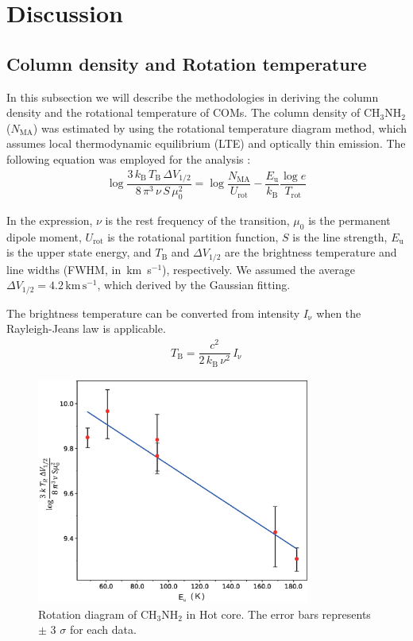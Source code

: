 \chapter{Discussion
  \label{chap:discussion}}

\section{Column density and Rotation temperature}

In this subsection we will describe the methodologies in deriving the column density and the rotational temperature of COMs.
The column density of CH$_{3}$NH$_{2}$ ($N_{\mathrm{MA}}$) was estimated by using 
the rotational temperature diagram method, which assumes local thermodynamic equilibrium 
(LTE) and optically thin emission. 
The following equation was employed for the analysis \citep{Turner1991}:
\begin{align}
\log \dfrac{3\,k_{\mathrm{B}}\,T_{\mathrm{B}} \,\Delta V_{1/2}}{8\, \pi^3\, \nu\, S\, \mu_0^2} = \log \dfrac{N_{\mathrm{MA}}}{U_{\mathrm{rot}}} - \dfrac{E_{\mathrm{u}}}{k_{\mathrm{B}}} \dfrac{\log e}{T_{\mathrm{rot}}}
\label{eq:RD}
\end{align}

In the expression, $\nu$ is the rest frequency of the transition, $\mu_0$ is the permanent dipole moment, 
$U_{\mathrm{rot}}$ is the rotational partition function, $S$ is the line strength, 
$E_{\mathrm{u}}$ is the upper state energy, and $ T_{\mathrm{B}}$ and  $\Delta V_{1/2}$ 
are the brightness temperature and line widths (FWHM, in~km~s$^{-1}$), respectively.
We assumed the average $\Delta V_{1/2} = 4.2\, \mathrm{km\,s^{-1}}$, which derived by the Gaussian fitting.

The brightness temperature can be converted from intensity $I_{\mathrm{\nu}}$
when the Rayleigh-Jeans law is applicable.
\begin{align}
T_{\mathrm{B}} = \dfrac{c^2}{2\,k_{\mathrm{B}}\, \nu^2} \,I_{\mathrm{\nu}}
\end{align}

\begin{figure}[H]
  \centering
  \includegraphics[width=0.8\textwidth]{OrionKL/RD_6point_label.eps}
  \caption{Rotation diagram of CH$_{3}$NH$_{2}$ in Hot core. The error bars represents $\pm$ 3 $\sigma$ for each data.}
  \label{fig:RD}
\end{figure}

